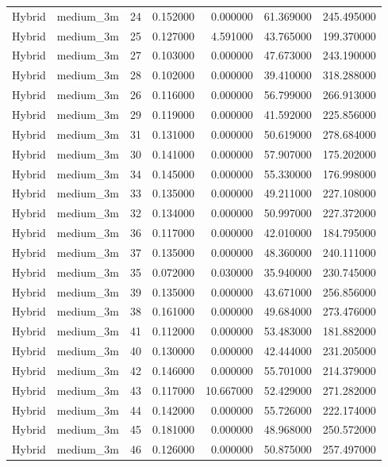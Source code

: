 \begin{tabular}{llrrrrr}
Hybrid & medium_3m & 24 & 0.152000 & 0.000000 & 61.369000 & 245.495000 \\
Hybrid & medium_3m & 25 & 0.127000 & 4.591000 & 43.765000 & 199.370000 \\
Hybrid & medium_3m & 27 & 0.103000 & 0.000000 & 47.673000 & 243.190000 \\
Hybrid & medium_3m & 28 & 0.102000 & 0.000000 & 39.410000 & 318.288000 \\
Hybrid & medium_3m & 26 & 0.116000 & 0.000000 & 56.799000 & 266.913000 \\
Hybrid & medium_3m & 29 & 0.119000 & 0.000000 & 41.592000 & 225.856000 \\
Hybrid & medium_3m & 31 & 0.131000 & 0.000000 & 50.619000 & 278.684000 \\
Hybrid & medium_3m & 30 & 0.141000 & 0.000000 & 57.907000 & 175.202000 \\
Hybrid & medium_3m & 34 & 0.145000 & 0.000000 & 55.330000 & 176.998000 \\
Hybrid & medium_3m & 33 & 0.135000 & 0.000000 & 49.211000 & 227.108000 \\
Hybrid & medium_3m & 32 & 0.134000 & 0.000000 & 50.997000 & 227.372000 \\
Hybrid & medium_3m & 36 & 0.117000 & 0.000000 & 42.010000 & 184.795000 \\
Hybrid & medium_3m & 37 & 0.135000 & 0.000000 & 48.360000 & 240.111000 \\
Hybrid & medium_3m & 35 & 0.072000 & 0.030000 & 35.940000 & 230.745000 \\
Hybrid & medium_3m & 39 & 0.135000 & 0.000000 & 43.671000 & 256.856000 \\
Hybrid & medium_3m & 38 & 0.161000 & 0.000000 & 49.684000 & 273.476000 \\
Hybrid & medium_3m & 41 & 0.112000 & 0.000000 & 53.483000 & 181.882000 \\
Hybrid & medium_3m & 40 & 0.130000 & 0.000000 & 42.444000 & 231.205000 \\
Hybrid & medium_3m & 42 & 0.146000 & 0.000000 & 55.701000 & 214.379000 \\
Hybrid & medium_3m & 43 & 0.117000 & 10.667000 & 52.429000 & 271.282000 \\
Hybrid & medium_3m & 44 & 0.142000 & 0.000000 & 55.726000 & 222.174000 \\
Hybrid & medium_3m & 45 & 0.181000 & 0.000000 & 48.968000 & 250.572000 \\
Hybrid & medium_3m & 46 & 0.126000 & 0.000000 & 50.875000 & 257.497000 \\

\end{tabular}
